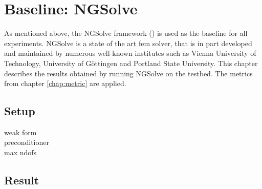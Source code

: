 \documentclass[./\jobname.tex]{subfiles}
\begin{document}
\section{Baseline: NGSolve}
As mentioned above, the NGSolve framework (\cite{schoberl_ngsolvengsolve_2020}) is used as the baseline for all experiments. NGSolve is a state of the art \gls{fem} solver, that is in part developed and maintained by numerous well-known institutes such as Vienna University of Technology, University of Göttingen and Portland State University. This chapter describes the results obtained by running NGSolve on the testbed. The metrics from chapter \ref{chap:metric} are applied. 

\subsection{Setup}
weak form\\
preconditioner\\
max ndofs \\


\subsection{Result}

\begin{table}[h]
	\centering
	\noindent{}
	\label{tab:fem_sol_quality}
\end{table}
\end{document}
